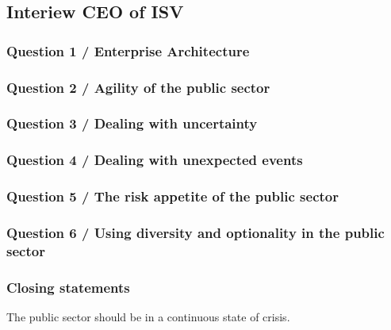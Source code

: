 \subsection{Interiew CEO of ISV}
\label{sub:interviewceoisv}

\subsubsection{Question 1 / Enterprise Architecture}

\subsubsection{Question 2 / Agility of the public sector}

\subsubsection{Question 3 / Dealing with uncertainty}

\subsubsection{Question 4 / Dealing with unexpected events}

\subsubsection{Question 5 / The risk appetite of the public sector}

\subsubsection{Question 6 / Using diversity and optionality in the public sector}

\subsubsection{Closing statements}


The public sector should be in a continuous state of crisis.

